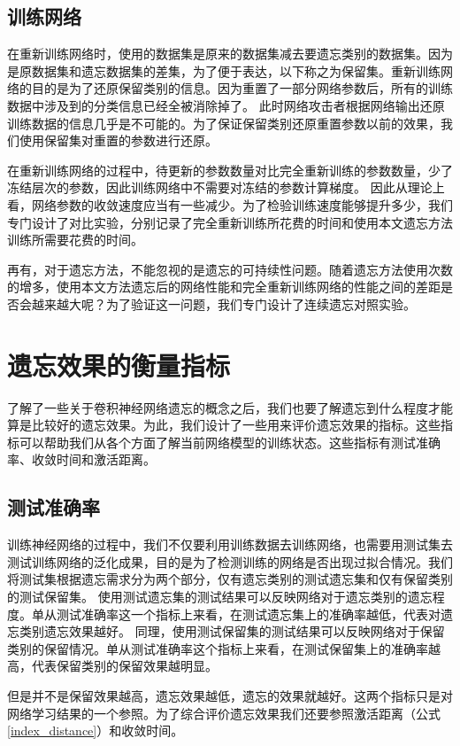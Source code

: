 \subsection{训练网络}
在重新训练网络时，使用的数据集是原来的数据集减去要遗忘类别的数据集。因为是原数据集和遗忘数据集的差集，为了便于表达，以下称之为保留集。重新训练网络的目的是为了还原保留类别的信息。因为重置了一部分网络参数后，所有的训练数据中涉及到的分类信息已经全被消除掉了。
此时网络攻击者根据网络输出还原训练数据的信息几乎是不可能的。为了保证保留类别还原重置参数以前的效果，我们使用保留集对重置的参数进行还原。

在重新训练网络的过程中，待更新的参数数量对比完全重新训练的参数数量，少了冻结层次的参数，因此训练网络中不需要对冻结的参数计算梯度。
因此从理论上看，网络参数的收敛速度应当有一些减少。为了检验训练速度能够提升多少，我们专门设计了对比实验，分别记录了完全重新训练所花费的时间和使用本文遗忘方法训练所需要花费的时间。

再有，对于遗忘方法，不能忽视的是遗忘的可持续性问题。随着遗忘方法使用次数的增多，使用本文方法遗忘后的网络性能和完全重新训练网络的性能之间的差距是否会越来越大呢？为了验证这一问题，我们专门设计了连续遗忘对照实验。

\section{遗忘效果的衡量指标} \label{forget_evaluation_index}

了解了一些关于卷积神经网络遗忘的概念之后，我们也要了解遗忘到什么程度才能算是比较好的遗忘效果。为此，我们设计了一些用来评价遗忘效果的指标。这些指标可以帮助我们从各个方面了解当前网络模型的训练状态。这些指标有测试准确率、收敛时间和激活距离。
\subsection{测试准确率}

训练神经网络的过程中，我们不仅要利用训练数据去训练网络，也需要用测试集去测试训练网络的泛化成果，目的是为了检测训练的网络是否出现过拟合情况。我们将测试集根据遗忘需求分为两个部分，仅有遗忘类别的测试遗忘集和仅有保留类别的测试保留集。
使用测试遗忘集的测试结果可以反映网络对于遗忘类别的遗忘程度。单从测试准确率这一个指标上来看，在测试遗忘集上的准确率越低，代表对遗忘类别遗忘效果越好。
同理，使用测试保留集的测试结果可以反映网络对于保留类别的保留情况。单从测试准确率这个指标上来看，在测试保留集上的准确率越高，代表保留类别的保留效果越明显。

但是并不是保留效果越高，遗忘效果越低，遗忘的效果就越好。这两个指标只是对网络学习结果的一个参照。为了综合评价遗忘效果我们还要参照激活距离（公式\ref{index_distance}）和收敛时间。

